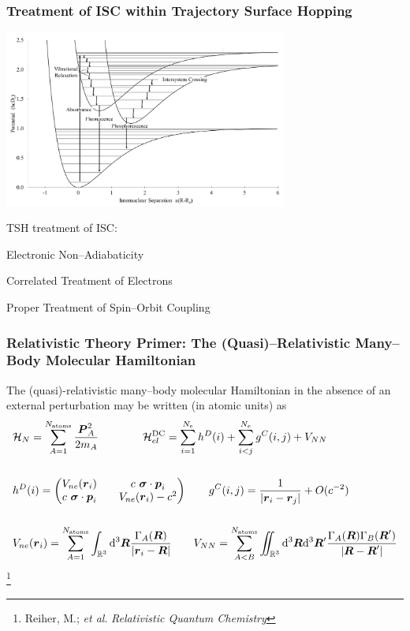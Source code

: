 \documentclass[usepdftitle=false,10pt]{beamer}
\newcommand{\cmark}{\color{green} \ding{51}}%
\newcommand{\done}{\rlap{$\square$}{\raisebox{2pt}{\large\hspace{1pt}\cmark}}%
\hspace{-2.5pt}}
\newcommand*\vc[1]{\boldsymbol{#1}}
\newcommand*\op[1]{\mathcal{#1}}
\renewcommand*\iint[0]{\int\hspace{-8pt}\int}
\newcommand\blfootnote[1]{%
  \begingroup
  \renewcommand\thefootnote{}\footnote{#1}%
  \addtocounter{footnote}{-1}%
  \endgroup
}
\begin{document}
\begin{frame}
  \frametitle{Treatment of ISC within Trajectory Surface Hopping}
  \begin{center}
  \includegraphics[width=0.7\textwidth]{ISC} 
  \end{center}
  \vspace{-0.5cm}
  TSH treatment of ISC: 
  \begin{mylist}
    \item[\done] Electronic Non--Adiabaticity
    \item[\done] Correlated Treatment of Electrons
    \item Proper Treatment of Spin--Orbit Coupling
  \end{mylist}
\end{frame}

\begin{frame}
  \frametitle{Relativistic Theory Primer: The (Quasi)--Relativistic Many--Body 
  Molecular Hamiltonian}

  The (quasi)-relativistic many--body molecular Hamiltonian in the absence of 
  an external perturbation may be written (in atomic units) as
  \begin{align*}
    &\op{H}_N = \sum_{A=1}^{N_\mathrm{atoms}} \frac{\vc{P}^2_A}{2m_A} \qquad\qquad
     \op{H}^\mathrm{DC}_{el} = 
       \sum_{i=1}^{N_e} h^D(i) + \sum_{i < j}^{N_e} g^C(i,j) + V_{NN} \\
    \\
    & h^D(i) = 
      \begin{pmatrix}
        V_{ne}(\vc{r}_i) && c\text{ }\vc{\sigma} \cdot \vc{p}_i\\
	c\text{ }\vc{\sigma} \cdot \vc{p}_i && V_{ne}(\vc{r}_i) - c^2
      \end{pmatrix} \qquad 
      g^C(i,j) = \frac{1}{\vert \vc{r}_i - \vc{r}_j\vert} + O(c^{-2})
      \\ \\ 
    & V_{ne}(\vc{r}_i) = \sum_{A=1}^{N_\mathrm{atoms}}
                    \int_{\mathbb{R}^3}\mathrm{d}^3\vc{R}
		    \frac{\Gamma_A(\vc{R})}{\vert \vc{r}_i - \vc{R}\vert}
      \qquad V_{NN} = \sum_{A<B}^{N_\mathrm{atoms}}
                    \iint_{\mathbb{R}^3}\mathrm{d}^3\vc{R}\mathrm{d}^3\vc{R}'
		    \frac{\Gamma_A(\vc{R})\Gamma_B(\vc{R}')}
		         {\vert \vc{R} - \vc{R}'\vert}
  \end{align*}
  \blfootnote{\tiny Reiher, M.; \emph{et al}. \emph{Relativistic Quantum Chemistry}}
\end{frame}
\end{document}
